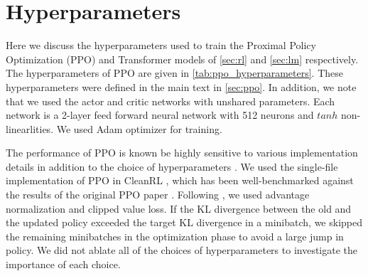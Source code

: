 
\section{Hyperparameters}\label{app:hyperparameters}

Here we discuss the hyperparameters used to train the Proximal Policy Optimization (PPO) and Transformer models of \autoref{sec:rl} and \autoref{sec:lm} respectively. 
The hyperparameters of PPO are given in \autoref{tab:ppo_hyperparameters}. These hyperparameters were defined in the main text in \autoref{sec:ppo}. In addition, we note that we used the actor and critic networks with unshared parameters. Each network is a 2-layer feed forward neural network with 512 neurons and $tanh$ non-linearlities. We used Adam optimizer for training. 
\newline 

The performance of PPO is known be highly sensitive to various implementation details in addition to the choice of hyperparameters \cite{shengyi2022the37implementation, engstrom2020implementation}. We used the single-file implementation of PPO in CleanRL \cite{huang2022cleanrl}, which has been well-benchmarked against the results of the original PPO paper \cite{schulman2017proximal}. Following  \cite{engstrom2020implementation}, we used advantage normalization and clipped value loss. If the KL divergence between the old and the updated policy exceeded the target KL divergence in a minibatch, we skipped the remaining minibatches in the optimization phase to avoid a large jump in policy. 
We did not ablate all of the choices of hyperparameters to investigate the importance of each choice.

